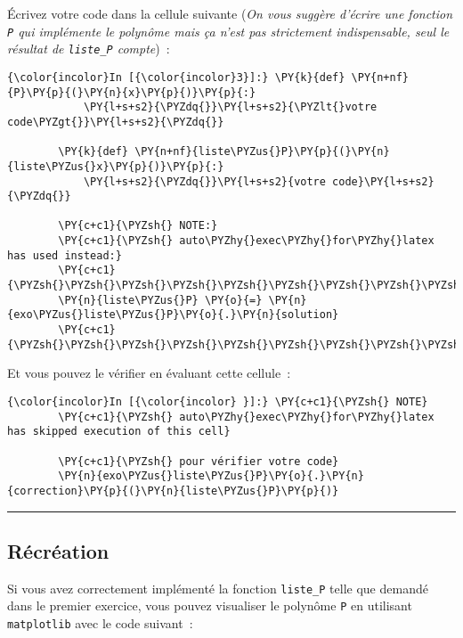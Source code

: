    Écrivez votre code dans la cellule suivante (\emph{On vous suggère
d'écrire une fonction \texttt{P} qui implémente le polynôme mais ça
n'est pas strictement indispensable, seul le résultat de
\texttt{liste\_P} compte})~:

    \begin{Verbatim}[commandchars=\\\{\}]
{\color{incolor}In [{\color{incolor}3}]:} \PY{k}{def} \PY{n+nf}{P}\PY{p}{(}\PY{n}{x}\PY{p}{)}\PY{p}{:}
            \PY{l+s+s2}{\PYZdq{}}\PY{l+s+s2}{\PYZlt{}votre code\PYZgt{}}\PY{l+s+s2}{\PYZdq{}}
        
        \PY{k}{def} \PY{n+nf}{liste\PYZus{}P}\PY{p}{(}\PY{n}{liste\PYZus{}x}\PY{p}{)}\PY{p}{:}
            \PY{l+s+s2}{\PYZdq{}}\PY{l+s+s2}{votre code}\PY{l+s+s2}{\PYZdq{}}
        
        \PY{c+c1}{\PYZsh{} NOTE:}
        \PY{c+c1}{\PYZsh{} auto\PYZhy{}exec\PYZhy{}for\PYZhy{}latex has used instead:}
        \PY{c+c1}{\PYZsh{}\PYZsh{}\PYZsh{}\PYZsh{}\PYZsh{}\PYZsh{}\PYZsh{}\PYZsh{}\PYZsh{}\PYZsh{}}
        \PY{n}{liste\PYZus{}P} \PY{o}{=} \PY{n}{exo\PYZus{}liste\PYZus{}P}\PY{o}{.}\PY{n}{solution}
        \PY{c+c1}{\PYZsh{}\PYZsh{}\PYZsh{}\PYZsh{}\PYZsh{}\PYZsh{}\PYZsh{}\PYZsh{}\PYZsh{}\PYZsh{}}
\end{Verbatim}


    Et vous pouvez le vérifier en évaluant cette cellule~:

    \begin{Verbatim}[commandchars=\\\{\}]
{\color{incolor}In [{\color{incolor} }]:} \PY{c+c1}{\PYZsh{} NOTE}
        \PY{c+c1}{\PYZsh{} auto\PYZhy{}exec\PYZhy{}for\PYZhy{}latex has skipped execution of this cell}
        
        \PY{c+c1}{\PYZsh{} pour vérifier votre code}
        \PY{n}{exo\PYZus{}liste\PYZus{}P}\PY{o}{.}\PY{n}{correction}\PY{p}{(}\PY{n}{liste\PYZus{}P}\PY{p}{)}
\end{Verbatim}


    \begin{center}\rule{0.5\linewidth}{\linethickness}\end{center}

    \hypertarget{ruxe9cruxe9ation}{%
\subsection{Récréation}\label{ruxe9cruxe9ation}}

    Si vous avez correctement implémenté la fonction \texttt{liste\_P} telle
que demandé dans le premier exercice, vous pouvez visualiser le polynôme
\texttt{P} en utilisant \texttt{matplotlib} avec le code suivant~:

